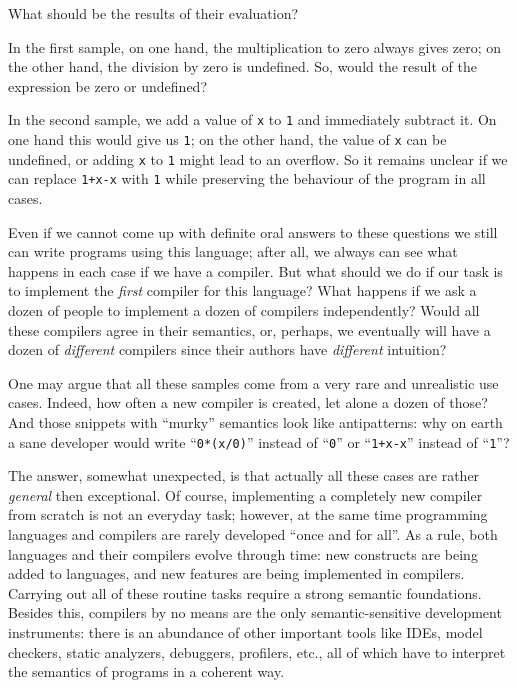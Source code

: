 What should be the results of their evaluation?

In the first sample, on one hand, the multiplication to zero always gives zero; on the other hand, the division by zero is undefined. So, would the result of
the expression be zero or undefined?

In the second sample, we add a value of \lstinline|x| to \lstinline|1| and immediately subtract it. On one hand this would give us \lstinline|1|; on the
other hand, the value of \lstinline|x| can be undefined, or adding \lstinline|x| to \lstinline|1| might lead to an overflow. So it remains unclear if we
can replace \lstinline|1+x-x| with \lstinline|1| while preserving the behaviour of the program in all cases.

Even if we cannot come up with definite oral answers to these questions we still can write programs using this language; after all, we always can
see what happens in each case if we have a compiler. But what should we do if our task is to implement the \emph{first} compiler for this language?
What happens if we ask a dozen of people to implement a dozen of compilers independently? Would all these compilers agree in their semantics, or, perhaps, we
eventually will have a dozen of \emph{different} compilers since their authors have \emph{different} intuition?

One may argue that all these samples come from a very rare and unrealistic use cases. Indeed, how often a new compiler is created, let alone a
dozen of those? And those snippets with ``murky'' semantics look like antipatterns: why on earth a sane developer would write ``\lstinline|0*(x/0)|''
instead of ``\lstinline|0|'' or ``\lstinline|1+x-x|'' instead of ``\lstinline|1|''?

The answer, somewhat unexpected, is that actually all these cases are rather \emph{general} then exceptional. Of course, implementing a completely new compiler from scratch is not an
everyday task; however, at the same time programming languages and compilers are rarely developed ``once and for all''. As a rule, both languages
and their compilers evolve through time: new constructs are being added to languages, and new features are being implemented in compilers. Carrying out all of
these routine tasks require a strong semantic foundations. Besides this, compilers by no means are the only semantic-sensitive development instruments:
there is an abundance of other important tools like IDEs, model checkers, static analyzers, debuggers, profilers, etc., all of which have to interpret the
semantics of programs in a coherent way.

